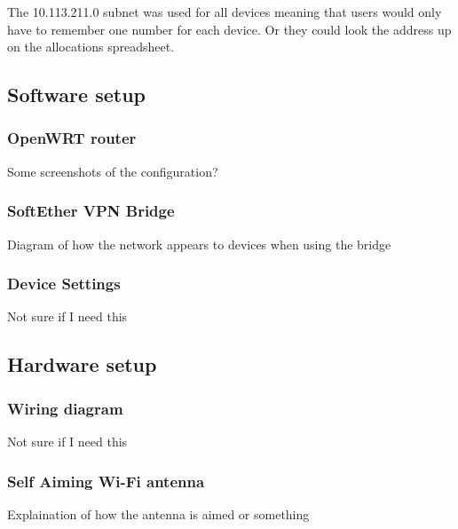 The 10.113.211.0 subnet was used for all devices meaning that users would only have to remember one number for each device. Or they could look the address up on the allocations spreadsheet.


\subsection{Software setup}
\subsubsection{OpenWRT router}
Some screenshots of the configuration?
\subsubsection{SoftEther VPN Bridge}
Diagram of how the network appears to devices when using the bridge
\subsubsection{Device Settings}
Not sure if I need this

\subsection{Hardware setup}
\subsubsection{Wiring diagram}
Not sure if I need this
\subsubsection{Self Aiming Wi-Fi antenna}
Explaination of how the antenna is aimed or something



